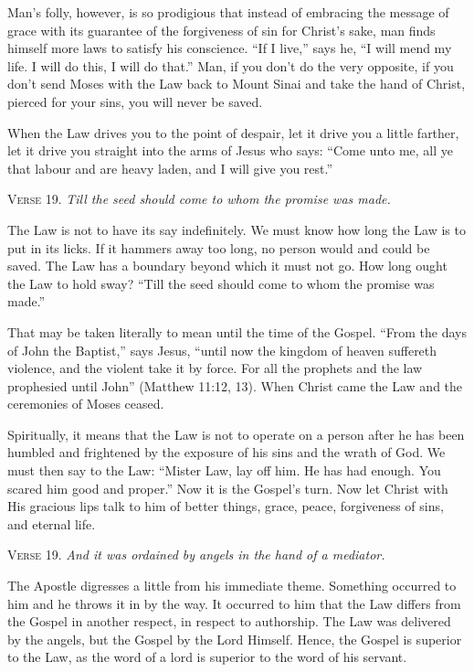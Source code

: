 Man’s folly, however, is so prodigious that instead of embracing the message of grace with its guarantee of the forgiveness of sin for Christ’s sake, man finds himself more laws to satisfy his conscience. “If I live,” says he, “I will mend my life. I will do this, I will do that.” Man, if you don’t do the very opposite, if you don’t send Moses with the Law back to Mount Sinai and take the hand of Christ, pierced for your sins, you will never be saved.

When the Law drives you to the point of despair, let it drive you a little farther, let it drive you straight into the arms of Jesus who says: “Come unto me, all ye that labour and are heavy laden, and I will give you rest.”

\textsc{Verse} 19. \emph{Till the seed should come to whom the promise was made.}

The Law is not to have its say indefinitely. We must know how long the Law is to put in its licks. If it hammers away too long, no person would and could be saved. The Law has a boundary beyond which it must not go. How long ought the Law to hold sway? “Till the seed should come to whom the promise was made.”

That may be taken literally to mean until the time of the Gospel. “From the days of John the Baptist,” says Jesus, “until now the kingdom of heaven suffereth violence, and the violent take it by force. For all the prophets and the law prophesied until John” (Matthew 11:12, 13). When Christ came the Law and the ceremonies of Moses ceased.

Spiritually, it means that the Law is not to operate on a person after he has been humbled and frightened by the exposure of his sins and the wrath of God. We must then say to the Law: “Mister Law, lay off him. He has had enough. You scared him good and proper.” Now it is the Gospel’s turn. Now let Christ with His gracious lips talk to him of better things, grace, peace, forgiveness of sins, and eternal life.

\textsc{Verse} 19. \emph{And it was ordained by angels in the hand of a mediator.}

The Apostle digresses a little from his immediate theme. Something occurred to him and he throws it in by the way. It occurred to him that the Law differs from the Gospel in another respect, in respect to authorship. The Law was delivered by the angels, but the Gospel by the Lord Himself. Hence, the Gospel is superior to the Law, as the word of a lord is superior to the word of his servant.

